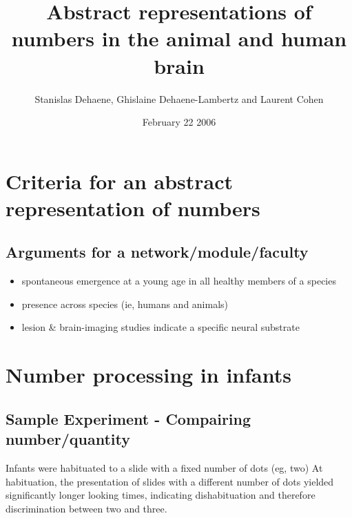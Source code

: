 \documentclass[12pt]{article}
\author{Stanislas Dehaene, Ghislaine Dehaene-Lambertz and Laurent Cohen}
\title {Abstract representations of numbers in the
animal and human brain}
\date{February 22 2006}
\begin{document}
\maketitle


\section{Criteria for an abstract representation of numbers}

\subsection*{Arguments for a network/module/faculty}

\begin{itemize}
\item spontaneous emergence at a young age in all healthy members of a species
\item presence across species (ie, humans and animals)
\item lesion \& brain-imaging studies indicate a specific neural substrate
\end{itemize}

\section{Number processing in infants}

\subsection*{Sample Experiment - Compairing number/quantity}
Infants were habituated to a slide with a fixed number of dots (eg, two)
At habituation, the presentation of
slides with a different number of dots
yielded significantly longer looking
times, indicating dishabituation and therefore discrimination
between two and three.
\end{document}

